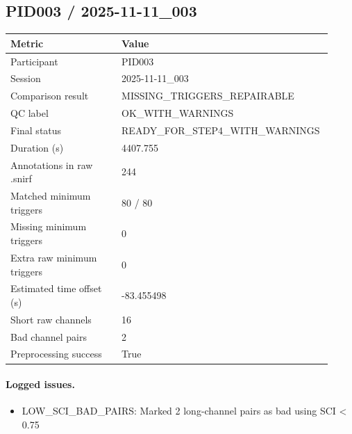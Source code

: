 \subsection*{PID003 / 2025-11-11\_003}
\begin{tabular}{p{0.34\linewidth}p{0.58\linewidth}}
\toprule
Metric & Value\\
\midrule
Participant & PID003\\
Session & 2025-11-11\_003\\
Comparison result & MISSING\_TRIGGERS\_REPAIRABLE\\
QC label & OK\_WITH\_WARNINGS\\
Final status & READY\_FOR\_STEP4\_WITH\_WARNINGS\\
Duration (s) & 4407.755\\
Annotations in raw .snirf & 244\\
Matched minimum triggers & 80 / 80\\
Missing minimum triggers & 0\\
Extra raw minimum triggers & 0\\
Estimated time offset (s) & -83.455498\\
Short raw channels & 16\\
Bad channel pairs & 2\\
Preprocessing success & True\\
\bottomrule
\end{tabular}
\paragraph{Logged issues.}
\begin{itemize}
\item [WARNING] LOW\_SCI\_BAD\_PAIRS: Marked 2 long-channel pairs as bad using SCI < 0.75
\end{itemize}
